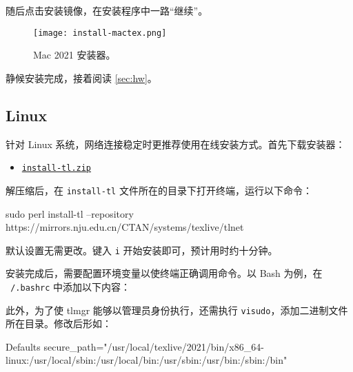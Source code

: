 随后点击安装镜像，在安装程序中一路“继续”。

\begin{figure}[htbp]
  \caption{Mac 2021 安装器。}
  \label{fig:install-mactex}
  \texttt{[image: install-mactex.png]}
\end{figure}

静候安装完成，接着阅读 \ref{sec:hw}。

\subsection{Linux}
\label{subsec:tl-linux}

针对 Linux 系统，网络连接稳定时更推荐使用在线安装方式。首先下载安装器：

\begin{itemize}
  \item \href{https://mirrors.nju.edu.cn/CTAN/systems/texlive/tlnet/install-tl.zip}{\faFile*[regular] \texttt{install-tl.zip}}
\end{itemize}

\begin{widepar}
解压缩后，在 \texttt{install-tl} 文件所在的目录下打开终端，运行以下命令：

\begin{shellexample}[morekeywords={perl}]
  sudo perl install-tl --repository https://mirrors.nju.edu.cn/CTAN/systems/texlive/tlnet
\end{shellexample}

默认设置无需更改。键入 \texttt{i} 开始安装即可，预计用时约十分钟。

安装完成后，需要配置环境变量以使终端正确调用命令。以 Bash 为例，在 \texttt{~/.bashrc} 中添加以下内容：


此外，为了使 tlmgr 能够以管理员身份执行，还需执行 \texttt{visudo}，添加二进制文件所在目录。修改后形如：

\begin{textexample}
  Defaults secure_path="/usr/local/texlive/2021/bin/x86_64-linux:/usr/local/sbin:/usr/local/bin:/usr/sbin:/usr/bin:/sbin:/bin"
\end{textexample}

\end{widepar}
